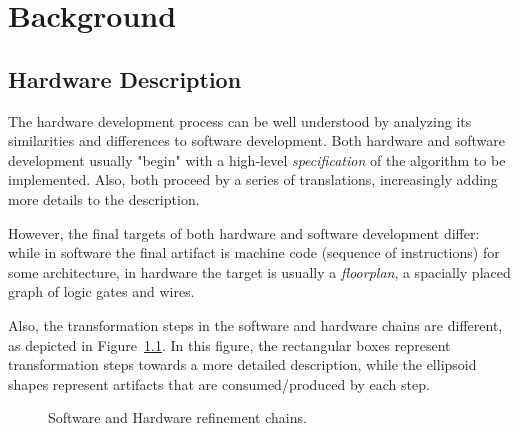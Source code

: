 \chapter{Background}
\label{chap:background}

    \section{Hardware Description}
    \label{sec:hardware-description}
        The hardware development process can be well understood by analyzing its
        similarities and differences to software development.
        Both hardware and software development usually "begin" with a high-level \emph{specification}
        of the algorithm to be implemented.
        Also, both proceed by a series of translations, increasingly adding more details to the description.

        However, the final targets of both hardware and software development differ:
        while in software the final artifact is machine code (sequence of instructions) for some architecture,
        in hardware the target is usually a \emph{floorplan}, a spacially placed graph of logic gates and wires.

        Also, the transformation steps in the software and hardware chains are different,
        as depicted in Figure~\ref{fig:sw-hw-chains}.
        In this figure, the rectangular boxes represent transformation steps towards a more detailed description,
        while the ellipsoid shapes represent artifacts that are consumed/produced by each step.

        \begin{figure}[h]
            \caption{Software and Hardware refinement chains. \label{fig:sw-hw-chains}}
        \end{figure}

